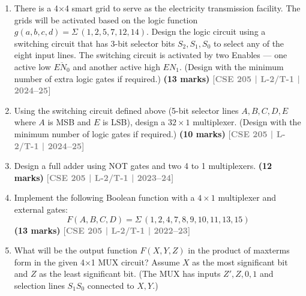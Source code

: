 \documentclass[12pt,a3paper]{article}
\newcommand{\yr}[1]{\hfill\textcolor{gray}{\small\textbf{[#1]}}}
\newcommand{\mk}[1]{\textcolor{orange!70!black}{\small\textbf{(#1 marks)}}}
\begin{document}
\begin{enumerate}

\item There is a 4$\times$4 smart grid to serve as the electricity transmission facility. The grids will be activated based on the logic function $g(a,b,c,d) = \Sigma\,(1,2,5,7,12,14)$. Design the logic circuit using a switching circuit that has 3-bit selector bits $S_2, S_1, S_0$ to select any of the eight input lines. The switching circuit is activated by two Enables — one active low $\overline{EN_0}$ and another active high $EN_1$. (Design with the minimum number of extra logic gates if required.)
\mk{13} \yr{CSE 205 | L-2/T-1 | 2024--25}

\item Using the switching circuit defined above (5-bit selector lines $A, B, C, D, E$ where $A$ is MSB and $E$ is LSB), design a $32\times1$ multiplexer. (Design with the minimum number of logic gates if required.)
\mk{10} \yr{CSE 205 | L-2/T-1 | 2024--25}

\item Design a full adder using NOT gates and two 4 to 1 multiplexers.
\mk{12} \yr{CSE 205 | L-2/T-1 | 2023--24}

\item Implement the following Boolean function with a $4 \times 1$ multiplexer and external gates:
\[ F(A, B, C, D) = \Sigma\,(1, 2, 4, 7, 8, 9, 10, 11, 13, 15) \]
\mk{13} \yr{CSE 205 | L-2/T-1 | 2022--23}

\item What will be the output function $F(X, Y, Z)$ in the product of maxterms form in the given 4$\times$1 MUX circuit? Assume $X$ as the most significant bit and $Z$ as the least significant bit. (The MUX has inputs $Z', Z, 0, 1$ and selection lines $S_1S_0$ connected to $X, Y$.)

\begin{center}
\end{center}
\end{enumerate}
\end{document}
